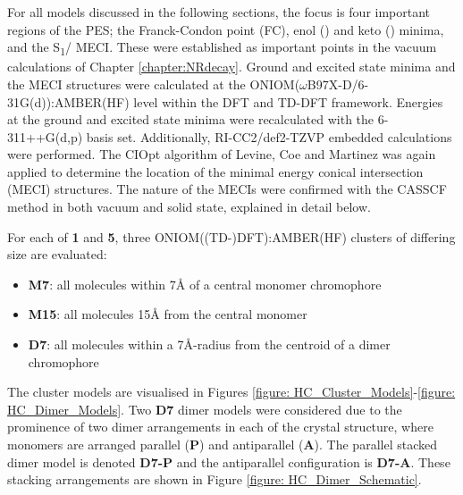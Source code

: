 For all models discussed in the following sections, the focus is four important regions of the \ac{PES}; the Franck-Condon point (FC), enol (\Estar) and keto (\Kstar) minima, and the S\textsubscript{1}/\szero{} MECI. These were established as important points in the vacuum calculations of Chapter \ref{chapter:NRdecay}. Ground and excited state minima and the MECI structures were calculated at the ONIOM($\omega$B97X-D/6-31G(d)):AMBER(HF) level within the DFT and TD-DFT framework. Energies at the ground and excited state minima were recalculated  with the 6-311++G(d,p) basis set. Additionally, RI-CC2/def2-TZVP embedded calculations were performed. The CIOpt algorithm of Levine, Coe and Martinez was again applied to determine the location of the minimal energy conical intersection (MECI) structures.\cite{Levine2008} The nature of the MECIs were confirmed with the CASSCF method in both vacuum and solid state, explained in detail below.

For each of \textbf{1} and \textbf{5}, three ONIOM((TD-)DFT):AMBER(HF) clusters of differing size are evaluated:
\begin{itemize}
    \item \textbf{M7}: all molecules within 7{\AA} of a central monomer chromophore
    \item \textbf{M15}: all molecules 15{\AA} from the central monomer
    \item \textbf{D7}: all molecules within a 7{\AA}-radius from the centroid of a dimer chromophore
\end{itemize}
The cluster models are visualised in Figures \ref{figure: HC_Cluster_Models}-\ref{figure: HC_Dimer_Models}. Two \textbf{D7} dimer models were considered due to the prominence of two dimer arrangements in each of the crystal structure, where monomers are arranged parallel (\textbf{P}) and antiparallel (\textbf{A}). The parallel stacked dimer model is denoted \textbf{D7-P} and the antiparallel configuration is \textbf{D7-A}. These stacking arrangements are shown in Figure \ref{figure: HC_Dimer_Schematic}.

